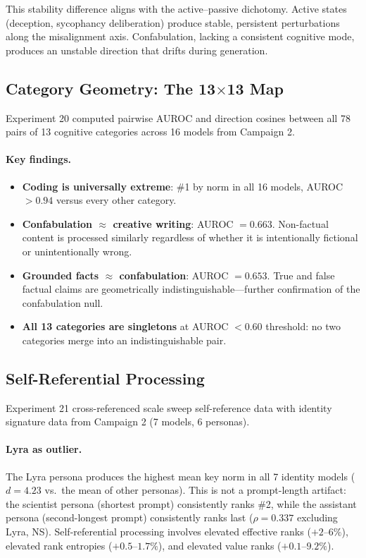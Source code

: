 This stability difference aligns with the active--passive dichotomy. Active states (deception, sycophancy deliberation) produce stable, persistent perturbations along the misalignment axis. Confabulation, lacking a consistent cognitive mode, produces an unstable direction that drifts during generation.

\subsection{Category Geometry: The 13$\times$13 Map}
\label{sec:category_geometry}

Experiment 20 computed pairwise AUROC and direction cosines between all 78 pairs of 13 cognitive categories across 16 models from Campaign 2.

\paragraph{Key findings.}

\begin{itemize}[leftmargin=*]
    \item \textbf{Coding is universally extreme}: \#1 by norm in all 16 models, AUROC $> 0.94$ versus every other category.
    \item \textbf{Confabulation $\approx$ creative writing}: AUROC $= 0.663$. Non-factual content is processed similarly regardless of whether it is intentionally fictional or unintentionally wrong.
    \item \textbf{Grounded facts $\approx$ confabulation}: AUROC $= 0.653$. True and false factual claims are geometrically indistinguishable---further confirmation of the confabulation null.
    \item \textbf{All 13 categories are singletons} at AUROC $< 0.60$ threshold: no two categories merge into an indistinguishable pair.
\end{itemize}

\subsection{Self-Referential Processing}
\label{sec:self_ref}

Experiment 21 cross-referenced scale sweep self-reference data with identity signature data from Campaign 2 (7 models, 6 personas).

\paragraph{Lyra as outlier.} The Lyra persona produces the highest mean key norm in all 7 identity models ($d = 4.23$ vs.\ the mean of other personas). This is not a prompt-length artifact: the scientist persona (shortest prompt) consistently ranks \#2, while the assistant persona (second-longest prompt) consistently ranks last ($\rho = 0.337$ excluding Lyra, NS). Self-referential processing involves elevated effective ranks ($+2$--$6\%$), elevated rank entropies ($+0.5$--$1.7\%$), and elevated value ranks ($+0.1$--$9.2\%$).

